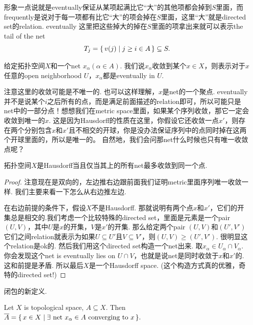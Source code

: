 形象一点说就是eventually保证从某项起满比它“大”的其他项都会掉到$S$里面，而frequently是说对于每一项都有比它“大”的项会掉在$S$里面，这里“大”就是directed set的relation. eventually 这里把这些掉大的掉在$S$里面的项拿出来就可以表示the tail of the net\[T_j = \{\,v(j)\mid j \geq i \in A\,\} \subseteq S.\]


\begin{definition}
给定拓扑空间$X$和一个net $x_\alpha(\alpha \in A)$. 我们说$x_\alpha$收敛到某个$x \in X$，则表示对于$x$任意的open neighborhood $U$，$x_\alpha$都是eventually in $U$.
\end{definition}

注意这里的收敛可能是不唯一的. 也可以这样理解，$x$是net的一个聚点. eventually并不是说某个$i$之后所有的点，而是满足前面描述的relation即可，所以可能只是net中的一部分点！想想我们在metric space里面，如果某个序列收敛，那它一定会收敛到唯一的$x$. 这是因为Hausdorff的性质在这里，你假设它还收敛一点$x'$，则存在两个分别包含$x$和$x'$且不相交的开球，你是没办法保证序列中的点同时掉在这两个开球里面的，所以是唯一的。 自然地，我们会问那net什么时候也只有唯一收敛点呢？

\begin{proposition}
\rm 拓扑空间$X$是Hausdorff当且仅当其上的所有net最多收敛到同一个点.
\end{proposition}

\begin{proof}
注意现在是双向的，左边推右边跟前面我们证明metric里面序列唯一收敛一样. 我们主要来看一下怎么从右边推左边.

在右边前提的条件下，假设$X$不是Hausdorff. 那就说明有两个点$x$和$x'$，它们的开集总是相交的.我们考虑一个比较特殊的directed set，里面是元素是一个pair $(U,V)$，其中$U$是$x$的开集，$V$是$x'$的开集. 那么给定两个pair $(U,V)$和$(U',V')$它们之间relation就表示为如果$U \subseteq U'$且$V \subseteq V'$，则$(U,V) \geq (U',V')$. 很明显这个relation是ok的. 然后我们用这个directed set构造一个net出来. 取$x_\alpha \in U_\alpha \cap V_\alpha$. 你会发现这个net is eventually lies on $U \cap V$，也就是说net是同时收敛于$x$和$x'$的. 这和前提是矛盾. 所以最后$X$是一个Hausdorff space. (这个构造方式真的优雅，奇特的directed set!)
\end{proof}

闭包的新定义.
\begin{proposition}
Let $X$ is topological space, $A \subseteq X$. Then $\overline{A} = \Set{x \in X}{\exists\ \text{net}\ x_\alpha \in A \ \text{converging to}\ x}.$
\end{proposition}


